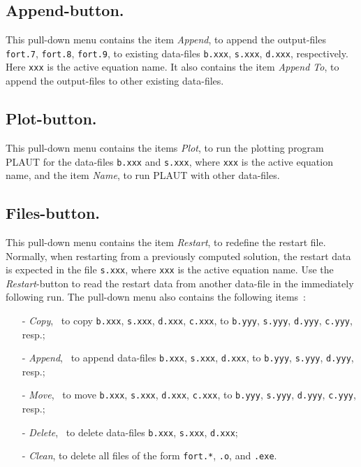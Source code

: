\documentclass[12pt]{report}
\begin{document}
\subsection{ Append-button.}
This pull-down menu contains the item
{\it Append},
to append the output-files {\tt fort.7}, {\tt fort.8}, {\tt fort.9},
to existing data-files {\tt b.xxx}, {\tt s.xxx}, {\tt d.xxx}, respectively.
Here {\tt xxx} is the active equation name.
It also contains the item
{\it Append To}, 
to append the output-files to other existing data-files.

\subsection{ Plot-button.}
This pull-down menu contains the items
{\it Plot},
to run the plotting program {\cal PLAUT} for the data-files 
{\tt b.xxx} and {\tt s.xxx},
where {\tt xxx} is the active equation name,
and the item
{\it Name}, 
to run {\cal PLAUT} with other data-files.


\subsection{ Files-button.}
This pull-down menu contains 
the item 
{\it Restart}, to redefine the restart file.
Normally, when restarting from a previously computed solution,
the restart data is expected in the file {\tt s.xxx},
where {\tt xxx} is the active equation name.
Use the {\it Restart}-button to read the restart data from another data-file
in the immediately following run.  
The pull-down menu also contains the following items~:
\begin{itemize}
\item[-]{\it Copy},~ to copy  
  {\tt b.xxx}, {\tt s.xxx}, {\tt d.xxx}, {\tt c.xxx},
  to
  {\tt b.yyy}, {\tt s.yyy}, {\tt d.yyy}, {\tt c.yyy}, resp.;

\item[-]{\it Append},~ to append data-files
  {\tt b.xxx}, {\tt s.xxx}, {\tt d.xxx},
  to
  {\tt b.yyy}, {\tt s.yyy}, {\tt d.yyy}, resp.;

\item[-]{\it Move},~ to move 
  {\tt b.xxx}, {\tt s.xxx}, {\tt d.xxx}, {\tt c.xxx},
  to
  {\tt b.yyy}, {\tt s.yyy}, {\tt d.yyy}, {\tt c.yyy}, resp.;

\item[-]{\it Delete},~ to delete data-files
  {\tt b.xxx}, {\tt s.xxx}, {\tt d.xxx};  

\item[-]{\it Clean}, to delete all files of the form 
  {\tt fort.*}, {\tt *.o}, and {\tt *.exe}.  
\end{itemize}
\end{document}
